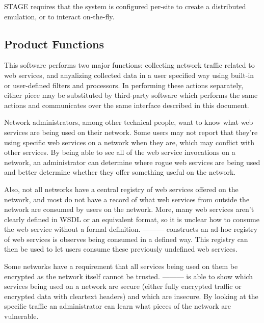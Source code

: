 \documentclass[titlepage]{article}
\begin{document}
STAGE requires that the system is configured per-site to create a distributed emulation, or to interact on-the-fly.


\subsection{Product Functions%
  \label{product-functions}%
}

This software performs two major functions: collecting network traffic related
to web services, and anyalizing collected data in a user specified
way using built-in or user-defined filters and processors.  In performing these
actions separately, either piece may be substituted by third-party software
which performs the same actions and communicates over the same interface
described in this document.  

Network administrators, among other technical people, want to know what web
services are being used on their network.  Some users may not report that
they're using specific web services on a network when they are, which may 
conflict with other services.  By being able to see all of the web service
invocations on a network, an administrator can determine where rogue web
services are being used and better determine whether they offer something
useful on the network.  

Also, not all networks have a central registry of web services offered on the
network, and most do not have a record of what web services from outside the
network are consumed by users on the network.  More, many web services aren't
clearly defined in WSDL or an equivalent format, so it is unclear how to consume
the web service without a formal definition.  --------- constructs an
ad-hoc registry of web services is observes being consumed in a defined way.
This registry can then be used to let users consume these previously undefined
web services.

Some networks have a requirement that all services being used on them be
encrypted as the network itself cannot be trusted.  --------- is able to
show which services being used on a network are secure (either fully encrypted
traffic or encrypted data with cleartext headers) and which are insecure.  By
looking at the specific traffic an administrator can learn what pieces of the
network are vulnerable.
\end{document}
